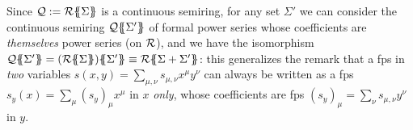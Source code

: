   
Since $\mathcal{Q}:={\mathcal{R}}\{\!\!\{\Sigma\}\!\!\}$ is a continuous semiring, for any set $\Sigma'$ we can consider the continuous semiring ${\mathcal{Q}}\{\!\!\{\Sigma'\}\!\!\}$ of formal power series whose coefficients are \emph{themselves} power series (on $\mathcal{R}$), and we have the isomorphism $\fps{\Qsemiring}{\Sigma'}=\fps{(\fps{\Rsemiring}{\Sigma})}{\Sigma'}\equiv\fps{\Rsemiring}{\Sigma+\Sigma'}$: this generalizes the remark that a fps in \emph{two} variables $s(x,y)=\sum_{\mu,\nu}s_{\mu,\nu}x^\mu y^\nu$ can always be written as a fps $s_y(x)=\sum_\mu (s_y)_\mu x^\mu$ in $x$ \emph{only}, whose coefficients are fps $(s_y)_\mu=\sum_\nu s_{\mu,\nu}y^\nu$ in $y$.
  
  
%   
   
   

